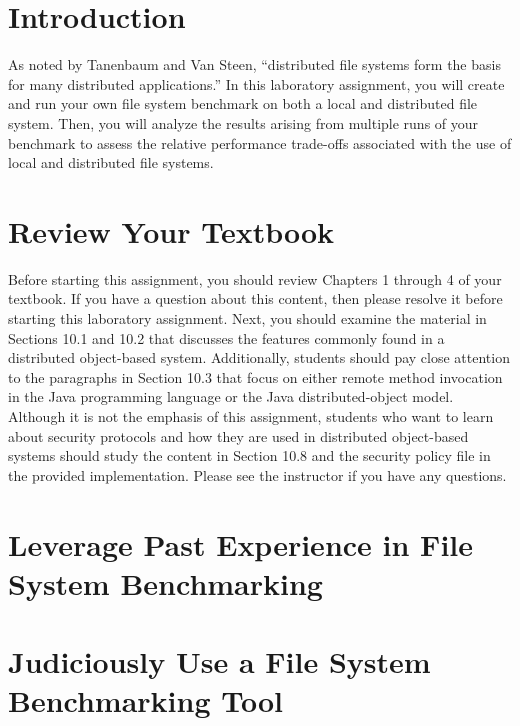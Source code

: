 

\usepackage[compact]{titlesec}



\section*{Introduction}

As noted by Tanenbaum and Van Steen, ``distributed file systems form the basis for many distributed applications.'' In
this laboratory assignment, you will create and run your own file system benchmark on both a local and distributed file
system. Then, you will analyze the results arising from multiple runs of your benchmark to assess the relative
performance trade-offs associated with the use of local and distributed file systems.

\section*{Review Your Textbook}

Before starting this assignment, you should review Chapters 1 through 4 of your textbook. If you have a question about
this content, then please resolve it before starting this laboratory assignment. Next, you should examine the material
in Sections 10.1 and 10.2 that discusses the features commonly found in a distributed object-based system. Additionally,
students should pay close attention to the paragraphs in Section 10.3 that focus on either remote method invocation in the Java
programming language or the Java distributed-object model. Although it is not the emphasis of this assignment, students
who want to learn about security protocols and how they are used in distributed object-based systems should study the
content in Section 10.8 and the security policy file in the provided implementation.  Please see the instructor if you
have any questions.

\section*{Leverage Past Experience in File System Benchmarking}



\section*{Judiciously Use a File System Benchmarking Tool}



